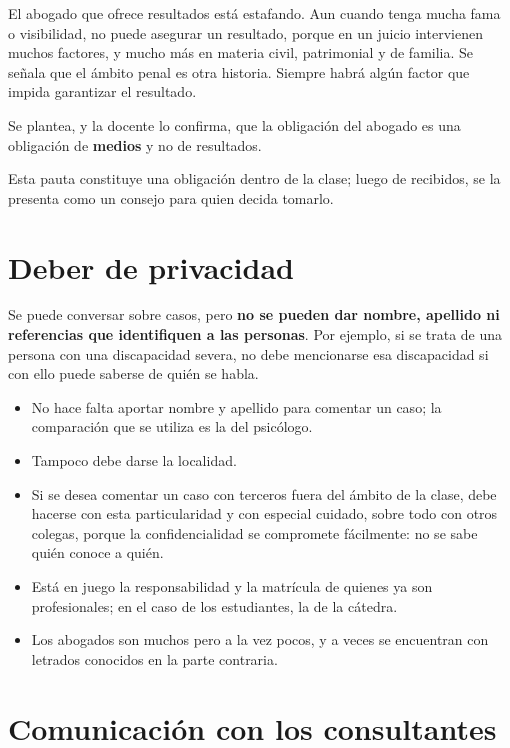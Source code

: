 \documentclass[12pt,oneside]{book}
\begin{document}
\begin{important}
El abogado que ofrece resultados está estafando. Aun cuando tenga mucha fama o visibilidad, no puede asegurar un resultado, porque en un juicio intervienen muchos factores, y mucho más en materia civil, patrimonial y de familia. Se señala que el ámbito penal es otra historia. Siempre habrá algún factor que impida garantizar el resultado.
\end{important}

Se plantea, y la docente lo confirma, que la obligación del abogado es una obligación de \textbf{medios} y no de resultados.

Esta pauta constituye una obligación dentro de la clase; luego de recibidos, se la presenta como un consejo para quien decida tomarlo.

\section{Deber de privacidad}

Se puede conversar sobre casos, pero \textbf{no se pueden dar nombre, apellido ni referencias que identifiquen a las personas}. Por ejemplo, si se trata de una persona con una discapacidad severa, no debe mencionarse esa discapacidad si con ello puede saberse de quién se habla.

\begin{itemize}
    \item No hace falta aportar nombre y apellido para comentar un caso; la comparación que se utiliza es la del psicólogo.
    \item Tampoco debe darse la localidad.
    \item Si se desea comentar un caso con terceros fuera del ámbito de la clase, debe hacerse con esta particularidad y con especial cuidado, sobre todo con otros colegas, porque la confidencialidad se compromete fácilmente: no se sabe quién conoce a quién.
    \item Está en juego la responsabilidad y la matrícula de quienes ya son profesionales; en el caso de los estudiantes, la de la cátedra.
    \item Los abogados son muchos pero a la vez pocos, y a veces se encuentran con letrados conocidos en la parte contraria.
\end{itemize}

\section{Comunicación con los consultantes}
\end{document}
